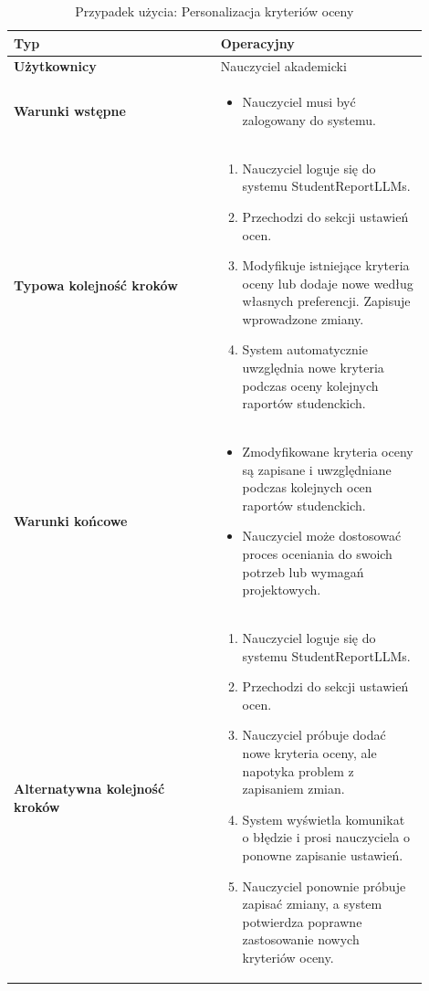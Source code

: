 \documentclass[a4paper, 12pt]{article}
\begin{document}
\footnotesize
\begin{center}
\begin{longtable}{|p{0.45\linewidth}|p{0.45\linewidth}|}
\caption{Przypadek użycia: Personalizacja kryteriów oceny} \\
\hline
\textbf{Typ} & Operacyjny \\
\hline
\textbf{Użytkownicy} & Nauczyciel akademicki \\
\hline
\textbf{Warunki wstępne} &
\begin{itemize}
    \item Nauczyciel musi być zalogowany do systemu.
\end{itemize} \\
\hline
\textbf{Typowa kolejność kroków} &
\begin{enumerate}
    \item Nauczyciel loguje się do systemu StudentReportLLMs.
    \item Przechodzi do sekcji ustawień ocen.
    \item Modyfikuje istniejące kryteria oceny lub dodaje nowe według własnych preferencji. Zapisuje wprowadzone zmiany.
    \item System automatycznie uwzględnia nowe kryteria podczas oceny kolejnych raportów studenckich.
\end{enumerate} \\
\hline
\textbf{Warunki końcowe} &
\begin{itemize}
    \item Zmodyfikowane kryteria oceny są zapisane i uwzględniane podczas kolejnych ocen raportów studenckich.
    \item Nauczyciel może dostosować proces oceniania do swoich potrzeb lub wymagań projektowych.
\end{itemize} \\
\hline
\textbf{Alternatywna kolejność kroków} &
\begin{enumerate}
    \item Nauczyciel loguje się do systemu StudentReportLLMs.
    \item Przechodzi do sekcji ustawień ocen.
    \item Nauczyciel próbuje dodać nowe kryteria oceny, ale napotyka problem z zapisaniem zmian.
    \item System wyświetla komunikat o błędzie i prosi nauczyciela o ponowne zapisanie ustawień.
    \item Nauczyciel ponownie próbuje zapisać zmiany, a system potwierdza poprawne zastosowanie nowych kryteriów oceny.

\end{enumerate}
\end{longtable}
\end{center}
\end{document}

